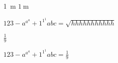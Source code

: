 \documentclass[parskip=full]{scrartcl}
\begin{document}
\SI{1}{\meter} $\SI{1}{\meter}$


$123 - a^{a^a} + 1^{1^1} abc = \sqrt{hhhhhhhhhhh}$


$\frac{1}{9}$


$123 - a^{a^a} + 1^{1^1} abc = \frac{1}{9} $
\end{document}
